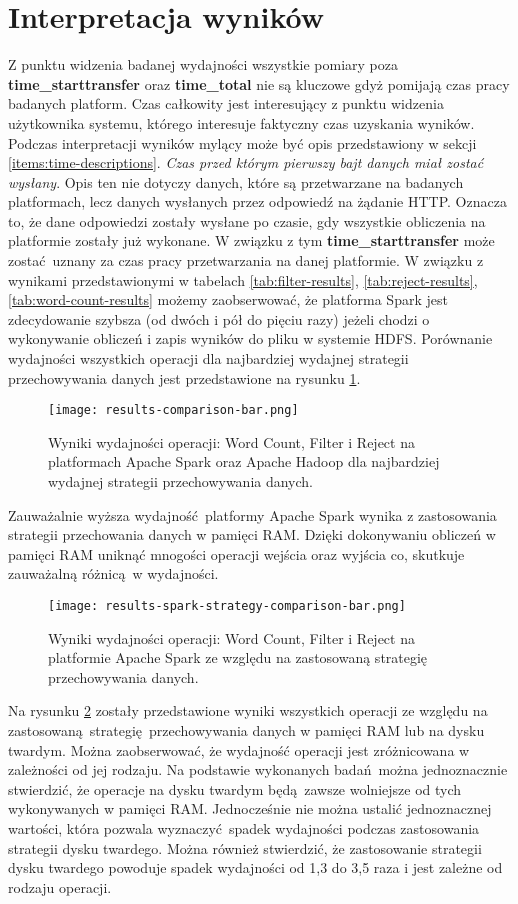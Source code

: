 \section{Interpretacja wyników}
Z punktu widzenia badanej wydajności wszystkie pomiary poza \textbf{time\_starttransfer} oraz \textbf{time\_total} nie są kluczowe gdyż pomijają czas pracy badanych platform. Czas całkowity jest interesujący z punktu widzenia użytkownika systemu, którego interesuje faktyczny czas uzyskania wyników. Podczas interpretacji wyników mylący może być opis przedstawiony w sekcji \ref{items:time-descriptions}. \textit{Czas przed którym pierwszy bajt danych miał zostać wysłany}. Opis ten nie dotyczy danych, które są przetwarzane na badanych platformach, lecz danych wysłanych przez odpowiedź na żądanie HTTP. Oznacza to, że dane odpowiedzi zostały wysłane po czasie, gdy wszystkie obliczenia na platformie zostały już wykonane. W związku z tym \textbf{time\_starttransfer} może zostać uznany za czas pracy przetwarzania na danej platformie.
\newline W związku z wynikami przedstawionymi w tabelach \ref{tab:filter-results}, \ref{tab:reject-results}, \ref{tab:word-count-results} możemy zaobserwować, że platforma Spark jest zdecydowanie szybsza (od dwóch i pół do pięciu razy) jeżeli chodzi o wykonywanie obliczeń i zapis wyników do pliku w systemie HDFS. Porównanie wydajności wszystkich operacji dla najbardziej wydajnej strategii przechowywania danych jest przedstawione na rysunku \ref{fig:results-comparison-bar}.
\begin{figure}[!htb]
	\centering
	\texttt{[image: results-comparison-bar.png]}
	\caption{Wyniki wydajności operacji: Word Count, Filter i Reject na platformach Apache Spark oraz Apache Hadoop dla najbardziej wydajnej strategii przechowywania danych.}
	\label{fig:results-comparison-bar}
\end{figure}
Zauważalnie wyższa wydajność platformy Apache Spark wynika z zastosowania strategii przechowania danych w pamięci RAM. Dzięki dokonywaniu obliczeń w pamięci RAM uniknąć mnogości operacji wejścia oraz wyjścia co, skutkuje zauważalną różnicą w wydajności.
\begin{figure}[!htb]
	\centering
	\texttt{[image: results-spark-strategy-comparison-bar.png]}
	\caption{Wyniki wydajności operacji: Word Count, Filter i Reject na platformie Apache Spark ze względu na zastosowaną strategię przechowywania danych.}
	\label{fig:results-spark-strategy-comparison-bar}
\end{figure}
Na rysunku \ref{fig:results-spark-strategy-comparison-bar} zostały przedstawione wyniki wszystkich operacji ze względu na zastosowaną strategię przechowywania danych w pamięci RAM lub na dysku twardym. Można zaobserwować, że wydajność operacji jest zróżnicowana w zależności od jej rodzaju. Na podstawie wykonanych badań można jednoznacznie stwierdzić, że operacje na dysku twardym będą zawsze wolniejsze od tych wykonywanych w pamięci RAM. Jednocześnie nie można ustalić jednoznacznej wartości, która pozwala wyznaczyć spadek wydajności podczas zastosowania strategii dysku twardego. Można również stwierdzić, że zastosowanie strategii dysku twardego powoduje spadek wydajności od 1,3 do 3,5 raza i jest zależne od rodzaju operacji. 
